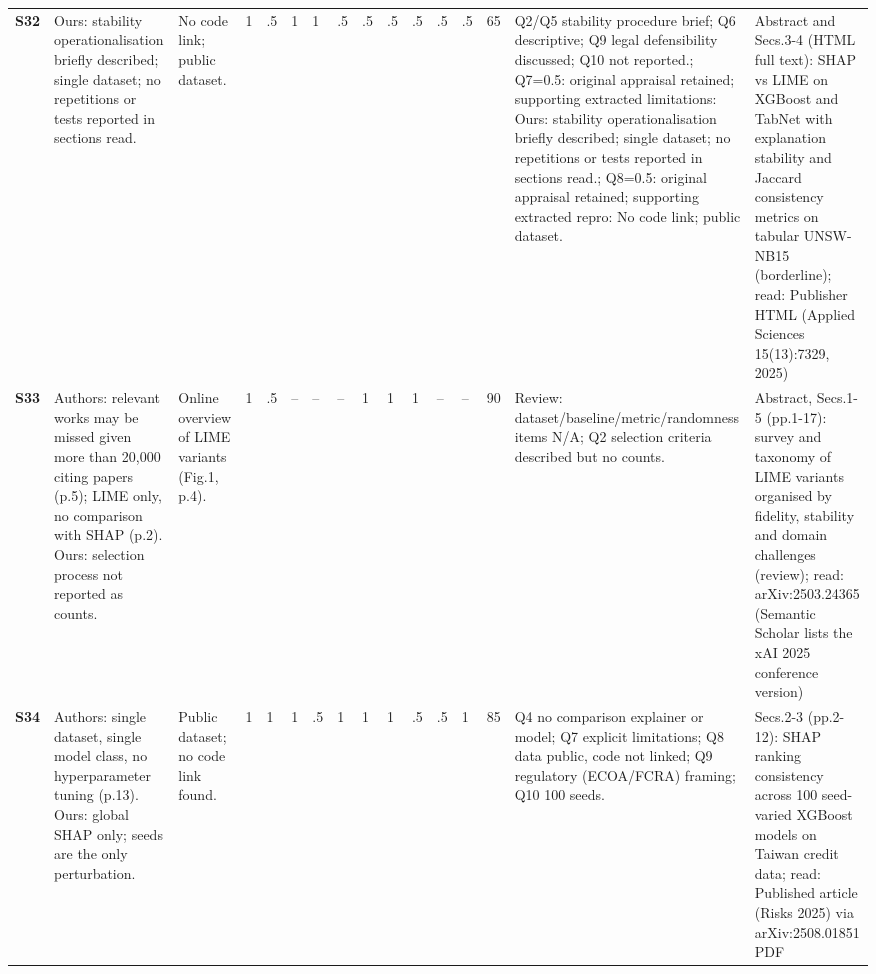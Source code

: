 \begin{longtable}{@{}P{1.0cm}P{4.6cm}P{3.6cm}P{0.3cm}P{0.3cm}P{0.3cm}P{0.3cm}P{0.3cm}P{0.3cm}P{0.3cm}P{0.3cm}P{0.3cm}P{0.36cm}P{0.75cm}P{3.0cm}P{3.9cm}@{}}
\textbf{S32} & Ours: stability operationalisation briefly described; single dataset; no repetitions or tests reported in sections read. & No code link; public dataset. & 1 & .5 & 1 & 1 & .5 & .5 & .5 & .5 & .5 & .5 & 65 & Q2/\allowbreak{}Q5 stability procedure brief; Q6 descriptive; Q9 legal defensibility discussed; Q10 not reported.; Q7=0.5: original appraisal retained; supporting extracted limitations: Ours: stability operationalisation briefly described; single dataset; no repetitions or tests reported in sections read.; Q8=0.5: original appraisal retained; supporting extracted repro: No code link; public dataset. & Abstract and Secs.3-4 (HTML full text): SHAP vs LIME on XGBoost and TabNet with explanation stability and Jaccard consistency metrics on tabular UNSW-NB15 (borderline); read: Publisher HTML (Applied Sciences 15(13):7329, 2025) \\
\textbf{S33} & Authors: relevant works may be missed given more than 20,000 citing papers (p.5); LIME only, no comparison with SHAP (p.2). Ours: selection process not reported as counts. & Online overview of LIME variants (Fig.1, p.4). & 1 & .5 & -- & -- & -- & 1 & 1 & 1 & -- & -- & 90 & Review: dataset/\allowbreak{}baseline/\allowbreak{}metric/\allowbreak{}randomness items N/\allowbreak{}A; Q2 selection criteria described but no counts. & Abstract, Secs.1-5 (pp.1-17): survey and taxonomy of LIME variants organised by fidelity, stability and domain challenges (review); read: arXiv:2503.24365 (Semantic Scholar lists the xAI 2025 conference version) \\
\textbf{S34} & Authors: single dataset, single model class, no hyperparameter tuning (p.13). Ours: global SHAP only; seeds are the only perturbation. & Public dataset; no code link found. & 1 & 1 & 1 & .5 & 1 & 1 & 1 & .5 & .5 & 1 & 85 & Q4 no comparison explainer or model; Q7 explicit limitations; Q8 data public, code not linked; Q9 regulatory (ECOA/\allowbreak{}FCRA) framing; Q10 100 seeds. & Secs.2-3 (pp.2-12): SHAP ranking consistency across 100 seed-varied XGBoost models on Taiwan credit data; read: Published article (Risks 2025) via arXiv:2508.01851 PDF \\

\end{longtable}
